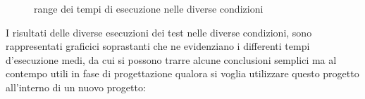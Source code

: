 \documentclass[12pt,a4paper,openright,twoside]{book}
\begin{document}
\begin{figure}[H]
    \caption{range dei tempi di esecuzione nelle diverse condizioni}
    \label{fig:range dei tempi di esecuzione}
\end{figure}

I risultati delle diverse esecuzioni dei test nelle diverse condizioni, sono rappresentati graficici soprastanti che ne evidenziano i differenti tempi d'esecuzione medi, 
da cui si possono trarre alcune conclusioni semplici ma al contempo utili in fase di progettazione qualora si voglia utilizzare questo progetto all'interno di un nuovo progetto:
\end{document}
